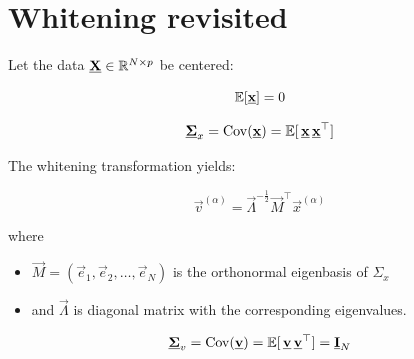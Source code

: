 \newpage

\section{Whitening revisited}

\begin{frame}{\secname}


Let the data $\underline{\mathbf{X}} \in \mathbb{R}^{N \times p}$ be centered:

\begin{equation}
\label{eq:centered}
\mathbb{E} \lbrack \underline{\mathbf{x}} \rbrack = 0 
\end{equation}


\begin{equation}
\label{eq:cov}
\underline{\mathbf{\Sigma}}_x = \mathrm{Cov}(\underline{\mathbf{x}}) = \mathbb{E} \lbrack \, \underline{\mathbf{x}} \, \underline{\mathbf{x}}^\top \rbrack 
\end{equation}

The whitening transformation yields:

\begin{equation}
\label{eq:whitening}
\vec v^{(\alpha)} = \vec \Lambda^{-\frac{1}{2}} \vec M^\top \vec x^{(\alpha)}
\end{equation}

where
\begin{itemize}
\item[] $\vec M = (\vec e_1, \vec e_2, \ldots,\vec e_N)$ is the orthonormal eigenbasis of $\Sigma_x$
\item[] and $\vec\Lambda$ is diagonal matrix with the corresponding eigenvalues.
\end{itemize}

\pause


\pause

\begin{equation}
\label{eq:covw}
\underline{\mathbf{\Sigma}}_v = \mathrm{Cov}(\underline{\mathbf{v}}) = \mathbb{E} \lbrack \, \underline{\mathbf{v}} \, \underline{\mathbf{v}}^\top \rbrack = \underline{\mathbf{I}}_N
\end{equation}

\end{frame}

